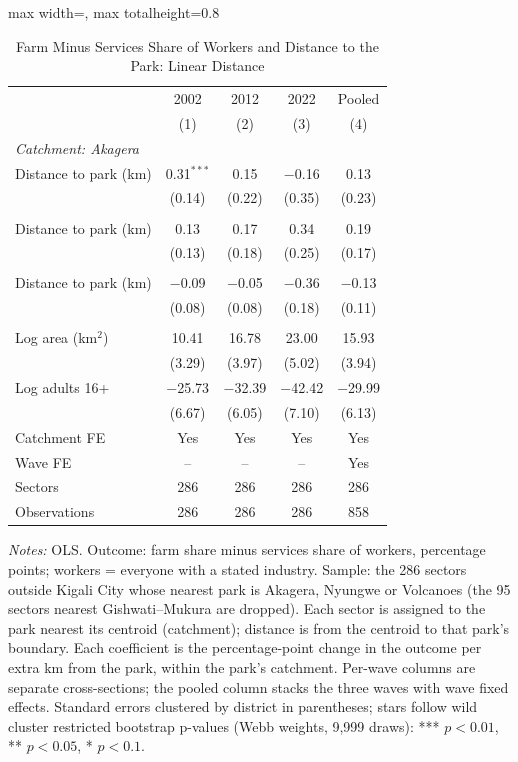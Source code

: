 \documentclass[11pt]{article}
\begin{document}
\begin{table}[H]
\centering\footnotesize\setlength{\tabcolsep}{4pt}
\caption{Farm Minus Services Share of Workers and Distance to the Park: Linear Distance}
\label{tab:main_linear_gap}
\begin{adjustbox}{max width=\textwidth, max totalheight=0.8\textheight}
\begin{tabular}{lcccc}
\toprule
 & 2002 & 2012 & 2022 & Pooled \\
 & (1) & (2) & (3) & (4) \\
\midrule
\multicolumn{5}{l}{\textit{Catchment: Akagera}} \\
\quad Distance to park (km) & 0.31$^{***}$ & 0.15 & $-$0.16 & 0.13 \\
 & (0.14) & (0.22) & (0.35) & (0.23) \\
\addlinespace
\multicolumn{5}{l}{\textit{Catchment: Nyungwe}} \\
\quad Distance to park (km) & 0.13 & 0.17 & 0.34 & 0.19 \\
 & (0.13) & (0.18) & (0.25) & (0.17) \\
\addlinespace
\multicolumn{5}{l}{\textit{Catchment: Volcanoes}} \\
\quad Distance to park (km) & $-$0.09 & $-$0.05 & $-$0.36 & $-$0.13 \\
 & (0.08) & (0.08) & (0.18) & (0.11) \\
\addlinespace
\multicolumn{5}{l}{\textit{Controls}} \\
\quad Log area (km$^2$) & 10.41 & 16.78 & 23.00 & 15.93 \\
 & (3.29) & (3.97) & (5.02) & (3.94) \\
\quad Log adults 16+ & $-$25.73 & $-$32.39 & $-$42.42 & $-$29.99 \\
 & (6.67) & (6.05) & (7.10) & (6.13) \\
\midrule
Catchment FE & Yes & Yes & Yes & Yes \\
Wave FE & -- & -- & -- & Yes \\
Sectors & 286 & 286 & 286 & 286 \\
Observations & 286 & 286 & 286 & 858 \\
\bottomrule
\end{tabular}
\end{adjustbox}
\begin{minipage}{0.97\textwidth}\scriptsize
\textit{Notes:} OLS. Outcome: farm share minus services share of workers, percentage points; workers = everyone with a stated industry. Sample: the 286 sectors outside Kigali City whose nearest park is Akagera, Nyungwe or Volcanoes (the 95 sectors nearest Gishwati--Mukura are dropped). Each sector is assigned to the park nearest its centroid (catchment); distance is from the centroid to that park's boundary. Each coefficient is the percentage-point change in the outcome per extra km from the park, within the park's catchment. Per-wave columns are separate cross-sections; the pooled column stacks the three waves with wave fixed effects. Standard errors clustered by district in parentheses; stars follow wild cluster restricted bootstrap p-values (Webb weights, 9,999 draws): *** $p<0.01$, ** $p<0.05$, * $p<0.1$.
\end{minipage}
\end{table}
\end{document}
